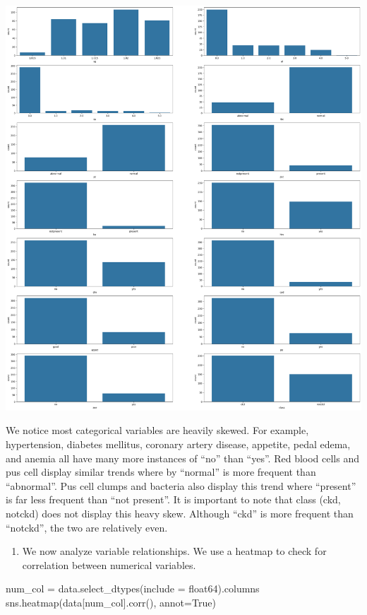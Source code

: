 \documentclass[
  11pt,
  letterpaper,
  DIV=11,
  numbers=noendperiod]{scrartcl}
\newenvironment{Shaded}{\begin{snugshade}}{\end{snugshade}}
\newcommand{\NormalTok}[1]{\textcolor[rgb]{0.00,0.23,0.31}{#1}}
\newcommand{\OperatorTok}[1]{\textcolor[rgb]{0.37,0.37,0.37}{#1}}
\newcommand{\StringTok}[1]{\textcolor[rgb]{0.13,0.47,0.30}{#1}}
\newcommand{\VariableTok}[1]{\textcolor[rgb]{0.07,0.07,0.07}{#1}}
\providecommand{\tightlist}{%
  \setlength{\itemsep}{0pt}\setlength{\parskip}{0pt}}\usepackage{longtable,booktabs,array}
\begin{document}
\includegraphics{Seebach_Lily_HW6_files/figure-pdf/cell-11-output-1.png}

We notice most categorical variables are heavily skewed. For example,
hypertension, diabetes mellitus, coronary artery disease, appetite,
pedal edema, and anemia all have many more instances of ``no'' than
``yes''. Red blood cells and pus cell display similar trends where by
``normal'' is more frequent than ``abnormal''. Pus cell clumps and
bacteria also display this trend where ``present'' is far less frequent
than ``not present''. It is important to note that class (ckd, notckd)
does not display this heavy skew. Although ``ckd'' is more frequent than
``notckd'', the two are relatively even.

\begin{enumerate}
\def\labelenumi{\arabic{enumi}.}
\setcounter{enumi}{3}
\tightlist
\item
  We now analyze variable relationships. We use a heatmap to check for
  correlation between numerical variables.
\end{enumerate}

\begin{Shaded}
\begin{Highlighting}[]
\NormalTok{num\_col }\OperatorTok{=}\NormalTok{ data.select\_dtypes(include }\OperatorTok{=} \StringTok{\textquotesingle{}float64\textquotesingle{}}\NormalTok{).columns}
\NormalTok{sns.heatmap(data[num\_col].corr(), annot}\OperatorTok{=}\VariableTok{True}\NormalTok{)}
\end{Highlighting}
\end{Shaded}
\end{document}
